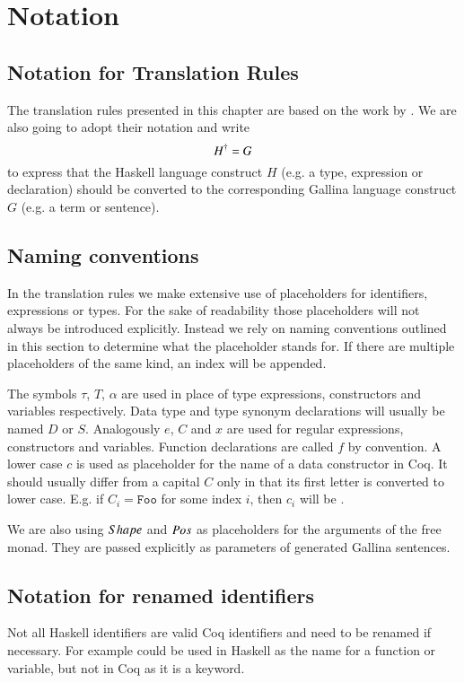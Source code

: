 \section{Notation} \label{sec:translation:notation}
\subsection{Notation for Translation Rules}
The translation rules presented in this chapter are based on the work by \cite{Abel:2005}.
We are also going to adopt their notation and write
\[
  {H}^{\dagger} = G
\]
to express that the Haskell language construct $H$ (e.g. a type, expression or declaration) should be converted to the corresponding Gallina language construct $G$ (e.g. a term or sentence).

\subsection{Naming conventions}
In the translation rules we make extensive use of placeholders for identifiers, expressions or types.
For the sake of readability those placeholders will not always be introduced explicitly.
Instead we rely on naming conventions outlined in this section to determine what the placeholder stands for.
If there are multiple placeholders of the same kind, an index will be appended.

The symbols $\tau$, $T$, $\alpha$ are used in place of type expressions, constructors and variables respectively.
Data type and type synonym declarations will usually be named $D$ or $S$.
Analogously $e$, $C$ and $x$ are used for regular expressions, constructors and variables.
Function declarations are called $f$ by convention.
A lower case $c$ is used as placeholder for the name of a data constructor in Coq.
It should usually differ from a capital $C$ only in that its first letter is converted to lower case.
E.g. if $C_i = \texttt{Foo}$ for some index $i$, then $c_i$ will be .

We are also using $Shape$ and $Pos$ as placeholders for the arguments of the free monad.
They are passed explicitly as parameters of generated Gallina sentences.

\subsection{Notation for renamed identifiers}
Not all Haskell identifiers are valid Coq identifiers and need to be renamed if necessary.
For example  could be used in Haskell as the name for a function or variable, but not in Coq as it is a keyword.

